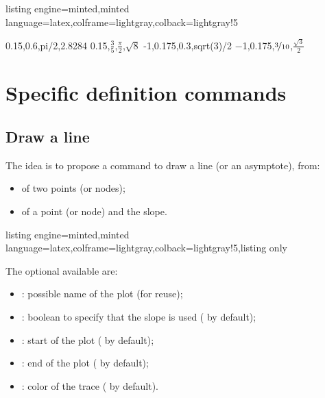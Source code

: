 \documentclass[11pt,a4paper]{ltxdoc}
\begin{document}
\begin{tcblisting}{listing engine=minted,minted language=latex,colframe=lightgray,colback=lightgray!5}
\begin{GraphTikz}%
	[x=2.75cm,y=3cm,
	Xmin=0,Xmax=3.5,Xgrid=pi/12,Xgrids=pi/24,
	Ymin=-1.05,Ymax=1.05,Ygrid=0.2,Ygrids=0.05]
	\DrawAxisGrids[Grads=false,Enlarge=2.5mm]{}{}
	\AddXvalues
		{0.15,0.6,pi/2,2.8284}
		{\num{0.15},$\frac35$,$\displaystyle\frac{\pi}{2}$,$\sqrt{8}$}
	\AddYvalues
		{-1,0.175,0.3,sqrt(3)/2}
		{\num{-1},\num{0.175},$\nicefrac{3}{10}$,$\frac{\sqrt{3}}{2}$}
\end{GraphTikz}
\end{tcblisting}

\pagebreak

\section{Specific definition commands}

\subsection{Draw a line}\label{tracstraight}

The idea is to propose a command to draw a line (or an asymptote), from:

\begin{itemize}
	\item of two points (or nodes);
	\item of a point (or node) and the slope.
\end{itemize}

\begin{tcblisting}{listing engine=minted,minted language=latex,colframe=lightgray,colback=lightgray!5,listing only}
\end{tcblisting}

The optional \MontreCode{[keys]} available are:

\smallskip

\begin{itemize}
	\item {}: possible name of the plot (for reuse);
	\item {}: boolean to specify that the slope is used ( by default);
	\item {}: start of the plot ( by default);
	\item {}: end of the plot ( by default);
	\item {}: color of the trace ( by default).
\end{itemize}
\end{document}
